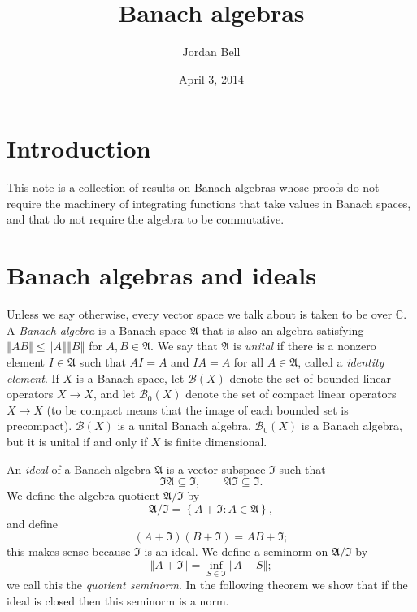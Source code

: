 \documentclass{article}
\newcommand{\norm}[1]{\left\Vert #1 \right\Vert}
\theoremstyle{definition}
\theoremstyle{definition}
\begin{document}
\title{Banach algebras}
\author{Jordan Bell}
\date{April 3, 2014}

\maketitle

\section{Introduction}
This note is a collection of results on Banach algebras whose proofs do not require the machinery of integrating functions that take values in Banach spaces, and that
do not require the algebra to be commutative.

\section{Banach algebras and ideals}
Unless we say otherwise, every vector  space we talk about is taken to be over $\mathbb{C}$. A   {\em Banach algebra}  is a  Banach space $\mathfrak{A}$ that is also an algebra satisfying
 $\norm{AB} \leq \norm{A} \norm{B}$ for $A,B \in \mathfrak{A}$. We say that $\mathfrak{A}$ is {\em unital} if there is 
 a nonzero element $I \in \mathfrak{A}$ such that $AI=A$ and $IA=A$ for all $A \in \mathfrak{A}$, called a {\em identity element}. 
If $X$ is a Banach space,
let $\mathscr{B}(X)$ denote the set of bounded linear operators $X \to X$, and let $\mathscr{B}_0(X)$ denote the set of compact linear operators
$X \to  X$ (to be compact means that the image of each bounded set is precompact). $\mathscr{B}(X)$ is a unital Banach algebra. $\mathscr{B}_0(X)$ is a Banach algebra,
but it is unital if and only if $X$ is finite dimensional.
 
An {\em ideal} of a Banach algebra $\mathfrak{A}$ is a vector subspace $\mathfrak{I}$  such that
\[
\mathfrak{I}\mathfrak{A} \subseteq \mathfrak{I}, \qquad \mathfrak{A} \mathfrak{I} \subseteq \mathfrak{I}.
\]
We define the algebra quotient $\mathfrak{A} / \mathfrak{I}$ by 
\[
\mathfrak{A} / \mathfrak{I} = \left\{ A+\mathfrak{I}: A \in \mathfrak{A}\right\},
\]
and define
\[
(A+\mathfrak{I})(B+\mathfrak{I}) = AB+\mathfrak{I};
\]
this makes sense because $\mathfrak{I}$ is an ideal.
We define a seminorm on $\mathfrak{A}/\mathfrak{I}$ by 
\[
\norm{A+\mathfrak{I}} = \inf_{S \in \mathfrak{I}} \norm{A-S};
\]
we call this the {\em quotient seminorm}. In the following theorem we show that if the ideal is closed then this seminorm is a norm.
\end{document}
